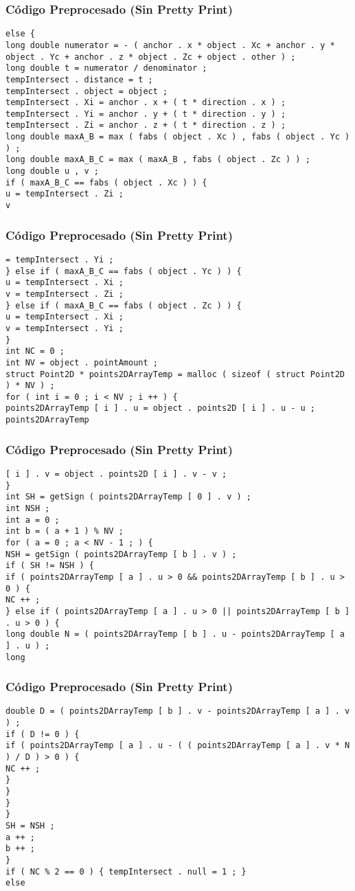 \documentclass{beamer}
\begin{document}
\begin{frame}[fragile]
\frametitle{C\'odigo Preprocesado (Sin Pretty Print)}
\begin{lstlisting}[style=CStyle]
else { 
long double numerator = - ( anchor . x * object . Xc + anchor . y * object . Yc + anchor . z * object . Zc + object . other ) ; 
long double t = numerator / denominator ; 
tempIntersect . distance = t ; 
tempIntersect . object = object ; 
tempIntersect . Xi = anchor . x + ( t * direction . x ) ; 
tempIntersect . Yi = anchor . y + ( t * direction . y ) ; 
tempIntersect . Zi = anchor . z + ( t * direction . z ) ; 
long double maxA_B = max ( fabs ( object . Xc ) , fabs ( object . Yc ) ) ; 
long double maxA_B_C = max ( maxA_B , fabs ( object . Zc ) ) ; 
long double u , v ; 
if ( maxA_B_C == fabs ( object . Xc ) ) { 
u = tempIntersect . Zi ; 
v \end{lstlisting}
\end{frame}
\begin{frame}[fragile]
\frametitle{C\'odigo Preprocesado (Sin Pretty Print)}
\begin{lstlisting}[style=CStyle]
= tempIntersect . Yi ; 
} else if ( maxA_B_C == fabs ( object . Yc ) ) { 
u = tempIntersect . Xi ; 
v = tempIntersect . Zi ; 
} else if ( maxA_B_C == fabs ( object . Zc ) ) { 
u = tempIntersect . Xi ; 
v = tempIntersect . Yi ; 
} 
int NC = 0 ; 
int NV = object . pointAmount ; 
struct Point2D * points2DArrayTemp = malloc ( sizeof ( struct Point2D ) * NV ) ; 
for ( int i = 0 ; i < NV ; i ++ ) { 
points2DArrayTemp [ i ] . u = object . points2D [ i ] . u - u ; 
points2DArrayTemp \end{lstlisting}
\end{frame}
\begin{frame}[fragile]
\frametitle{C\'odigo Preprocesado (Sin Pretty Print)}
\begin{lstlisting}[style=CStyle]
[ i ] . v = object . points2D [ i ] . v - v ; 
} 
int SH = getSign ( points2DArrayTemp [ 0 ] . v ) ; 
int NSH ; 
int a = 0 ; 
int b = ( a + 1 ) % NV ; 
for ( a = 0 ; a < NV - 1 ; ) { 
NSH = getSign ( points2DArrayTemp [ b ] . v ) ; 
if ( SH != NSH ) { 
if ( points2DArrayTemp [ a ] . u > 0 && points2DArrayTemp [ b ] . u > 0 ) { 
NC ++ ; 
} else if ( points2DArrayTemp [ a ] . u > 0 || points2DArrayTemp [ b ] . u > 0 ) { 
long double N = ( points2DArrayTemp [ b ] . u - points2DArrayTemp [ a ] . u ) ; 
long \end{lstlisting}
\end{frame}
\begin{frame}[fragile]
\frametitle{C\'odigo Preprocesado (Sin Pretty Print)}
\begin{lstlisting}[style=CStyle]
double D = ( points2DArrayTemp [ b ] . v - points2DArrayTemp [ a ] . v ) ; 
if ( D != 0 ) { 
if ( points2DArrayTemp [ a ] . u - ( ( points2DArrayTemp [ a ] . v * N ) / D ) > 0 ) { 
NC ++ ; 
} 
} 
} 
} 
SH = NSH ; 
a ++ ; 
b ++ ; 
} 
if ( NC % 2 == 0 ) { tempIntersect . null = 1 ; } 
else \end{lstlisting}
\end{frame}
\end{document}
